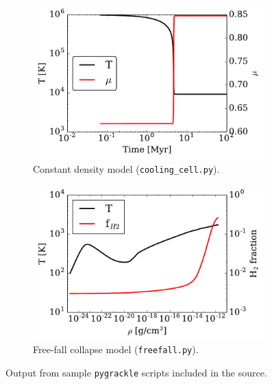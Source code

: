 
\begin{figure}
\centering
\begin{subfigure}{.48\textwidth}
  \centering
  \includegraphics[width=0.98\textwidth]{figures/cooling_cell.pdf}
  \caption{Constant density model (\texttt{cooling\_cell.py}).}
  \label{fig:cooling-cell}
\end{subfigure}%
\begin{subfigure}{.48\textwidth}
  \centering
  \includegraphics[width=0.98\textwidth]{figures/freefall.pdf}
  \caption{Free-fall collapse model (\texttt{freefall.py}).}
  \label{fig:freefall}
\end{subfigure}%
\caption{Output from sample \texttt{pygrackle} scripts included in the \grackle{}
  source.}
\label{fig:evolve}
\vspace*{-1\baselineskip}
\end{figure}

